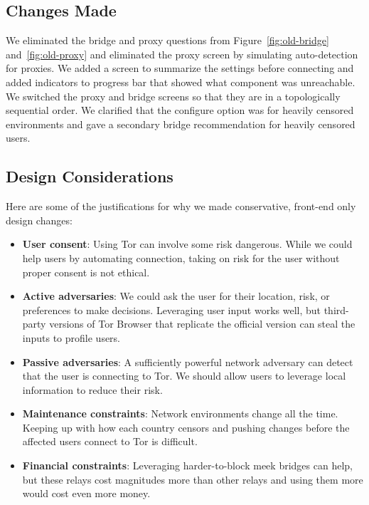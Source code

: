 \documentclass[USenglish,oneside,twocolumn]{article}
\begin{document}
\subsection{Changes Made} 
We eliminated the bridge and proxy questions from Figure~\ref{fig:old-bridge} and~\ref{fig:old-proxy} and eliminated the proxy screen by simulating auto-detection for proxies. We added a screen to summarize the settings before connecting and added indicators to progress bar that showed what component was unreachable. We switched the proxy and bridge screens so that they are in a topologically sequential order. We clarified that the configure option was for heavily censored environments and gave a secondary bridge recommendation for heavily censored users. 

\subsection {Design Considerations} 

Here are some of the justifications for why we made conservative, front-end only design changes: \\

\begin{itemize}
\item {\bfseries User consent}: Using Tor can involve some risk dangerous. While we could help users by automating connection, taking on risk for the user without proper consent is not ethical. 

\item{\bfseries Active adversaries}: We could ask the user for their location, risk, or preferences to make decisions. Leveraging user input works well, but third-party versions of Tor Browser that replicate the official version can steal the inputs to profile users. 

\item {\bfseries  Passive adversaries}: A sufficiently powerful network adversary can detect that the user is connecting to Tor. We should allow users to leverage local information to reduce their risk.

\item{\bfseries  Maintenance constraints}: Network environments change all the time. Keeping up with how each country censors and pushing changes before the affected users connect to Tor is difficult.

\item{\bfseries  Financial constraints}: Leveraging harder-to-block meek bridges can help, but these relays cost magnitudes more than other relays and using them more would cost even more money.
\end{itemize}
\end{document}
